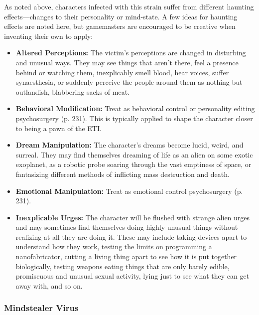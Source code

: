 As noted above, characters infected with this strain 
suffer from different haunting effects—changes 
to their personality or mind-state. A few ideas for 
haunting effects are noted here, but gamemasters are 
encouraged to be creative when inventing their own 
to apply:

\begin{itemize}
\item  \textbf{Altered Perceptions:} The victim's perceptions are 
changed in disturbing and unusual ways. They 
may see things that aren't there, feel a presence 
behind or watching them, inexplicably smell 
blood, hear voices, suffer synaesthesia, or suddenly
perceive the people around them as nothing
but outlandish, blabbering sacks of meat.
\item \textbf{Behavioral Modification:} Treat as behavioral control
or personality editing psychosurgery (p. 231).
This is typically applied to shape the character 
closer to being a pawn of the ETI.
\item  \textbf{Dream Manipulation:} The character's dreams 
become lucid, weird, and surreal. They may find 
themselves dreaming of life as an alien on some 
exotic exoplanet, as a robotic probe soaring 
through the vast emptiness of space, or fantasizing
different methods of inflicting mass destruction
and death.
\item  \textbf{Emotional Manipulation:} Treat as emotional 
control psychosurgery (p. 231). 
\item  \textbf{Inexplicable Urges:} The character will be flushed 
with strange alien urges and may sometimes find 
themselves doing highly unusual things without 
realizing at all they are doing it. These may include
taking devices apart to understand how
they work, testing the limits on programming a 
nanofabricator, cutting a living thing apart to see 
how it is put together biologically, testing weapons
eating things that are only barely edible, promiscuous
and unusual sexual activity, lying just
to see what they can get away with, and so on.
\end{itemize}

\subsubsection{Mindstealer Virus}

